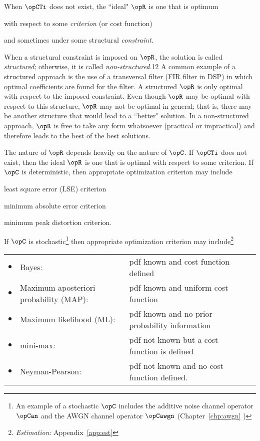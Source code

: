 When $\opCTi$ does not exist, the ``ideal" $\opR$ is one that is
optimum
  \begin{enume}
    \item with respect to some {\em criterion} (or cost function)
    \item and sometimes under some structural {\em constraint}.
  \end{enume}
When a structural constraint is imposed on $\opR$,
the solution is called {\em structured}; otherwise,
it is called {\em non-structured}.\citep{vantrees1}{12}
A common example of a structured approach is the use of a
transversal filter (FIR filter in DSP) in which optimal coefficients
are found for the filter.
A structured $\opR$ is only optimal with respect to the
imposed constraint.
Even though $\opR$ may be optimal with respect to this structure,
$\opR$ may not be optimal in general;
that is, there may be another structure that would lead to a ``better"
solution.
In a non-structured approach, $\opR$ is free to take any form
whatsoever (practical or impractical) and therefore leads to the
best of the best solutions.

The nature of $\opR$ depends heavily on the nature of $\opC$.
If $\opCTi$ does not exist,
then the ideal $\opR$ is one that is optimal with respect to some criterion.
If $\opC$ is deterministic,
then appropriate optimization criterion may include
\begin{liste}
   \item least square error (LSE) criterion
   \item minimum absolute error criterion
   \item minimum peak distortion criterion.
\end{liste}
If $\opC$ is stochastic\footnote{
  An example of a stochastic $\opC$ includes the additive noise channel
  operator $\opCan$ and the AWGN channel operator $\opCawgn$
  (Chapter~\ref{chp:awgn} )
  }
then appropriate optimization criterion may include\footnote{
  {\em Estimation}: Appendix~\ref{app:est} 
  }

\begin{tabular}{llll}
   $\bullet$ & Bayes:                                  & pdf known and cost function defined \\
   $\bullet$ & Maximum aposteriori probability (MAP):  & pdf known and uniform cost function \\
   $\bullet$ & Maximum likelihood (ML):                & pdf known and no prior probability information\\
   $\bullet$ & mini-max:                               & pdf not known but a cost function is defined \\
   $\bullet$ & Neyman-Pearson:                         & pdf not known and no cost function defined.
\end{tabular}

